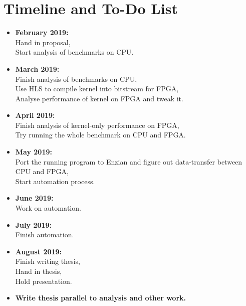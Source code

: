 \documentclass[12pt]{article}
\begin{document}
\section*{Timeline and To-Do List}
\begin{itemize}
\item \textbf{February 2019:}\\
Hand in proposal,\\
Start analysis of benchmarks on CPU.
\item \textbf{March 2019:}\\
Finish analysis of benchmarks on CPU,\\
Use HLS to compile kernel into bitstream for FPGA,\\
Analyse performance of kernel on FPGA and tweak it.
\item \textbf{April 2019:}\\
Finish analysis of kernel-only performance on FPGA,\\
Try running the whole benchmark on CPU and FPGA.
\item \textbf{May 2019:}\\
Port the running program to Enzian and figure out data-transfer between CPU and FPGA,\\
Start automation process.
\item \textbf{June 2019:}\\ 
Work on automation.
\item \textbf{July 2019:}\\
Finish automation.
\item \textbf{August 2019:}\\
Finish writing thesis,\\
Hand in thesis,\\
Hold presentation.
\item \textbf{Write thesis parallel to analysis and other work.}
\end{itemize}
\end{document}
